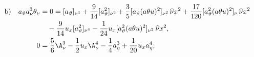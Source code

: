 
\[
\begin{aligned}
\text{b)}\quad
 a_\vartheta a_\nu^3\theta_\nu
&=0=[a_\vartheta]_{\nu^4}+\frac9{14}[a_\vartheta^2]_{\nu^3}
+\frac35[a_\vartheta(a\theta u)^2]_{\nu^2}\,\widehat{\nu}x^2
+\frac{17}{120}[a_\vartheta^2(a\theta u)^2]_{\nu}\,\widehat{\nu}x^2\\
&\quad-\frac9{14}u_x[a_\vartheta^2]_{\nu^4}
-\frac1{24}u_x[a_\vartheta^2(a\theta u)^2]_{\nu^2}\,\widehat{\nu}x^2,\\
0&=\frac56\A_\nu^3-\frac12u_x\A_\nu^4-\frac14a_\eta^3+\frac1{20}u_xa_\eta^4;
\end{aligned}
\]
